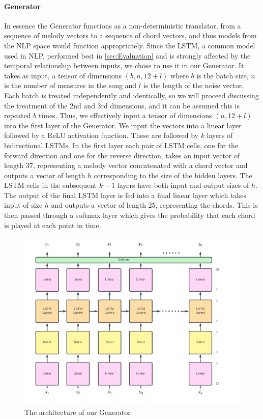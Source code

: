 \paragraph{Generator}
In essence the Generator functions as a non-deterministic translator, from a sequence of melody vectors to a sequence of chord vectors, and thus models from the NLP space would function appropriately.
Since the LSTM, a common model used in NLP, performed best in \cref{sec:Evaluation} and is strongly affected by the temporal relationship between inputs, we chose to use it in our Generator.
It takes as input, a tensor of dimensions $(b,n,12+l)$ where $b$ is the batch size, $n$ is the number of measures in the song and $l$ is the length of the noise vector.
Each batch is treated independently and identically, so we will proceed discussing the treatment of the 2nd and 3rd dimensions, and it can be assumed this is repeated $b$ times.
Thus, we effectively input a tensor of dimensions $(n,12+l)$ into the first layer of the Generator.
We input the vectors into a linear layer followed by a ReLU activation function. 
These are followed by $k$ layers of bidirectional LSTMs.
In the first layer each pair of LSTM cells, one for the forward direction and one for the reverse direction, takes an input vector of length 37, representing a melody vector concatenated with a chord vector and outputs a vector of length $h$ corresponding to the size of the hidden layers.
The LSTM cells in the subsequent $k-1$ layers have both input and output sizes of $h$.
The output of the final LSTM layer is fed into a final linear layer which takes input of size $h$ and outputs a vector of length 25, representing the chords.
This is then passed through a softmax layer which gives the probability that each chord is played at each point in time.

\begin{figure}
    \centering
    \includegraphics[width=0.8\columnwidth]{Figures/Generator}
    \decoRule
    \caption{The architecture of our Generator}
    \label{fig:Generator}
\end{figure}

